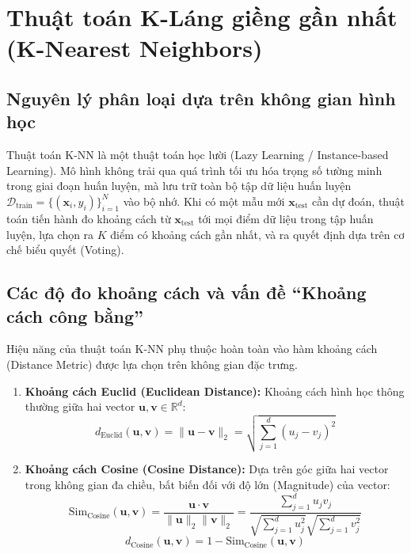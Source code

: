 \section{Thuật toán K-Láng giềng gần nhất (K-Nearest Neighbors)}
\label{sec:knn-ly-thuyet}

\subsection{Nguyên lý phân loại dựa trên không gian hình học}
Thuật toán K-NN là một thuật toán học lười (Lazy Learning / Instance-based Learning). Mô hình không trải qua quá trình tối ưu hóa trọng số tường minh trong giai đoạn huấn luyện, mà lưu trữ toàn bộ tập dữ liệu huấn luyện $\mathcal{D}_{\text{train}} = \{(\mathbf{x}_i, y_i)\}_{i=1}^N$ vào bộ nhớ. Khi có một mẫu mới $\mathbf{x}_{\text{test}}$ cần dự đoán, thuật toán tiến hành đo khoảng cách từ $\mathbf{x}_{\text{test}}$ tới mọi điểm dữ liệu trong tập huấn luyện, lựa chọn ra $K$ điểm có khoảng cách gần nhất, và ra quyết định dựa trên cơ chế biểu quyết (Voting).

\subsection{Các độ đo khoảng cách và vấn đề “Khoảng cách công bằng”}
Hiệu năng của thuật toán K-NN phụ thuộc hoàn toàn vào hàm khoảng cách (Distance Metric) được lựa chọn trên không gian đặc trưng.
\begin{enumerate}
    \item \textbf{Khoảng cách Euclid (Euclidean Distance):}
    Khoảng cách hình học thông thường giữa hai vector $\mathbf{u}, \mathbf{v} \in \mathbb{R}^d$:
    \begin{equation}
    d_{\text{Euclid}}(\mathbf{u}, \mathbf{v}) = \|\mathbf{u} - \mathbf{v}\|_2 = \sqrt{\sum_{j=1}^d (u_j - v_j)^2}
    \end{equation}
    \item \textbf{Khoảng cách Cosine (Cosine Distance):}
    Dựa trên góc giữa hai vector trong không gian đa chiều, bất biến đối với độ lớn (Magnitude) của vector:
    \begin{equation}
    \text{Sim}_{\text{Cosine}}(\mathbf{u}, \mathbf{v}) = \frac{\mathbf{u} \cdot \mathbf{v}}{\|\mathbf{u}\|_2 \|\mathbf{v}\|_2} = \frac{\sum_{j=1}^d u_j v_j}{\sqrt{\sum_{j=1}^d u_j^2} \sqrt{\sum_{j=1}^d v_j^2}}
    \end{equation}
    \begin{equation}
    d_{\text{Cosine}}(\mathbf{u}, \mathbf{v}) = 1 - \text{Sim}_{\text{Cosine}}(\mathbf{u}, \mathbf{v})
    \end{equation}
\end{enumerate}

